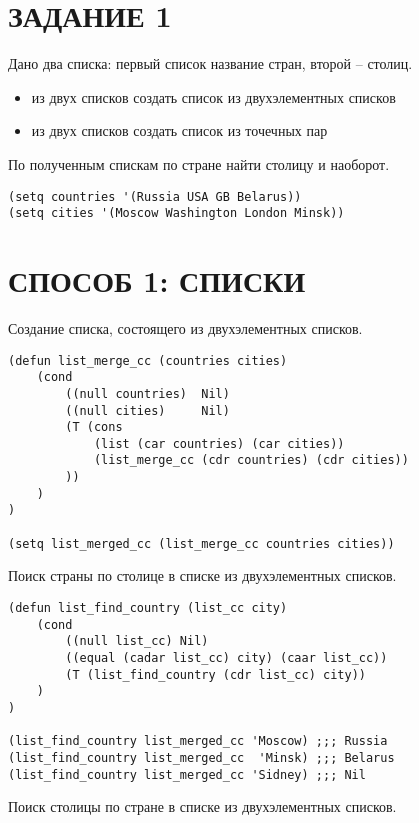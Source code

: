 \section{ЗАДАНИЕ 1}

Дано два списка: первый список название стран, второй -- столиц.

\begin{itemize}
    \item из двух списков создать список из двухэлементных списков
    \item из двух списков создать список из точечных пар
\end{itemize}

По полученным спискам по стране найти столицу и наоборот.

\begin{lstlisting}
(setq countries '(Russia USA GB Belarus))
(setq cities '(Moscow Washington London Minsk))
\end{lstlisting}

\section{СПОСОБ 1: СПИСКИ}

Создание списка, состоящего из двухэлементных списков.

\begin{lstlisting}
(defun list_merge_cc (countries cities)
    (cond
        ((null countries)  Nil)
        ((null cities)     Nil)
        (T (cons
            (list (car countries) (car cities))
            (list_merge_cc (cdr countries) (cdr cities))
        ))
    )
)

(setq list_merged_cc (list_merge_cc countries cities))
\end{lstlisting}

Поиск страны по столице в списке из двухэлементных списков.

\begin{lstlisting}
(defun list_find_country (list_cc city)
    (cond
        ((null list_cc) Nil)
        ((equal (cadar list_cc) city) (caar list_cc))
        (T (list_find_country (cdr list_cc) city))
    )
)

(list_find_country list_merged_cc 'Moscow) ;;; Russia
(list_find_country list_merged_cc  'Minsk) ;;; Belarus
(list_find_country list_merged_cc 'Sidney) ;;; Nil
\end{lstlisting}

Поиск столицы по стране в списке из двухэлементных списков.

